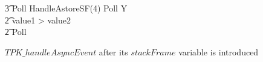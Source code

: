 \begin{figure}[tp!]
\begin{circusaction}
    \t3 Poll \circseq HandleAstoreSF(4) \circseq Poll \circseq Y \\
    \t2 {} \circelse value1 > value2 \circthen \Skip \\
    \t2 \circfi \circseq Poll
  \end{circusaction}
  \caption{$TPK\_handleAsyncEvent$ after its $stackFrame$ variable is
    introduced}
  \label{efs-localise-stack-frames-example-figure}
\end{figure}